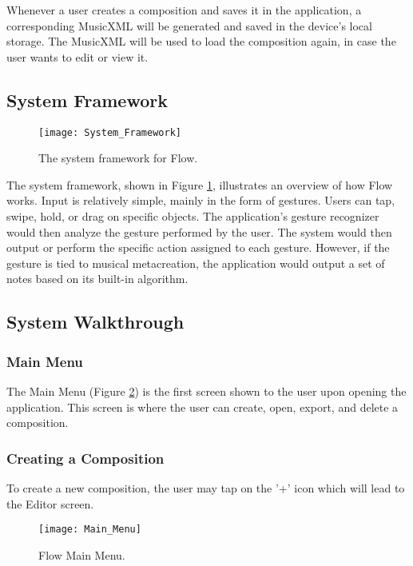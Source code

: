 Whenever a user creates a composition and saves it in the application, a corresponding MusicXML will be generated and saved in the device's local storage. The MusicXML will be used to load the composition again, in case the user wants to edit or view it. 

\subsection{System Framework}

\begin{figure}[H]
	\centering
	\texttt{[image: System\_Framework]}
    \caption{The system framework for Flow.}
    \label{fig:systemframework}
\end{figure}

The system framework, shown in Figure \ref{fig:systemframework}, illustrates an overview of how Flow works. Input is relatively simple, mainly in the form of gestures. Users can tap, swipe, hold, or drag on specific objects. The application's gesture recognizer would then analyze the gesture performed by the user. The system would then output or perform the specific action assigned to each gesture. However, if the gesture is tied to musical metacreation, the application would output a set of notes based on its built-in algorithm.

\subsection{System Walkthrough}

\subsubsection{Main Menu}
The Main Menu (Figure \ref{fig:main-menu}) is the first screen shown to the user upon opening the application. This screen is where the user can create, open, export, and delete a composition. 

\subsubsection{Creating a Composition}
To create a new composition, the user may tap on the '+' icon which will lead to the Editor screen. 

\begin{figure}[H]
	\centering
	\texttt{[image: Main\_Menu]}
    \caption{Flow Main Menu.}
    \label{fig:main-menu}
\end{figure}

